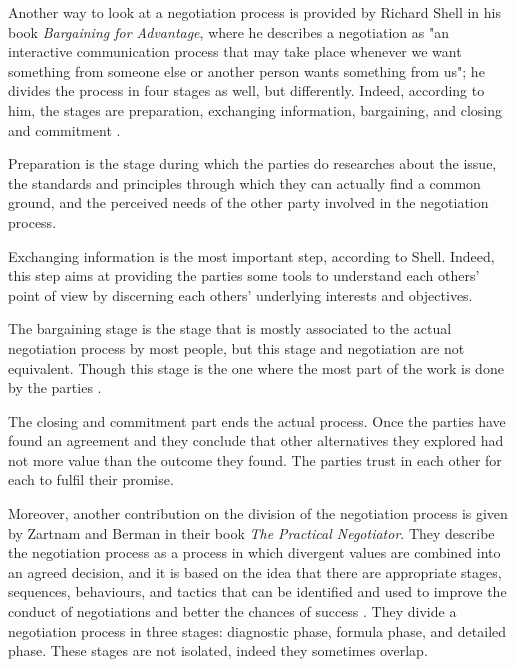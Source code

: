 \documentclass[../main.tex]{subfiles}
\begin{document}
Another way to look at a negotiation process is provided by Richard Shell in his book \textit{Bargaining for Advantage}, where he describes a negotiation as "an interactive communication process that may take place whenever we want something from someone else or another person wants something from us"\autocite[24]{shell}; he divides the process in four stages as well, but differently. Indeed, according to him, the stages are preparation, exchanging information, bargaining, and closing and commitment \autocite[134]{shell}.

Preparation is the stage during which the parties do researches about the issue, the standards and principles through which they can actually find a common ground, and the perceived needs of the other party involved in the negotiation process.

Exchanging information is the most important step, according to Shell. Indeed, this step aims at providing the parties some tools to understand each others' point of view by discerning each others' underlying interests and objectives.

The bargaining stage is the stage that is mostly associated to the actual negotiation process by most people, but this stage and negotiation are not equivalent. Though this stage is the one where the most part of the work is done by the parties \autocite[324]{culo}.

The closing and commitment part ends the actual process. Once the parties have found an agreement and they conclude that other alternatives they explored had not more value than the outcome they found. The parties trust in each other for each to fulfil their promise. 

Moreover, another contribution on the division of the negotiation process is given by Zartnam and Berman in their book \textit{The Practical Negotiator}. They describe the negotiation process as a process in which divergent values are combined into an agreed decision, and it is based on the idea that there are appropriate stages, sequences, behaviours, and tactics that can be identified and used to improve the conduct of negotiations and better the chances of success \autocite[2]{zartman1982practical}. They divide a negotiation process in three stages: diagnostic phase, formula phase, and detailed phase. These stages are not isolated, indeed they sometimes overlap.
\end{document}
